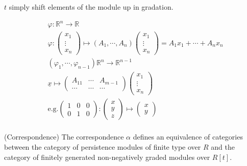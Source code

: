 \documentclass[11pt,a4paper]{report}
\begin{document}
              $t$ simply shift elements of the module up in gradation. 
              
            \begin{Ex}

              \begin{align*}
                &\varphi: \mathbb{R}^n \rightarrow \mathbb{R}\\
                &\varphi: \begin{pmatrix}x_1\\\vdots\\x_n\end{pmatrix} \mapsto (A_1, \cdots, A_n)\begin{pmatrix}x_1\\\vdots\\x_n\end{pmatrix} = A_1x_1 + \cdots + A_nx_n\\
                &(\varphi_1, \cdots, \varphi_{n-1}) \mathbb{R}^n \rightarrow \mathbb{R}^{n-1}\\
                &\underline{x} \mapsto \begin{pmatrix}A_{11} & \cdots & A_{m-1}\\ \cdots&\cdots&\cdots\end{pmatrix}\begin{pmatrix}x_1\\\vdots\\x_n\end{pmatrix}\\
                &\textrm{e.g.} \begin{pmatrix}1&0&0\\0&1&0\end{pmatrix}:\begin{pmatrix}x\\y\\z\end{pmatrix} \mapsto \begin{pmatrix}x\\y\end{pmatrix}\\
              \end{align*}

            \end{Ex}
            
            
              \begin{thm} (Correspondence) The correspondence $\alpha$ defines an equivalence of categories between the category of persistence modules of finite type over $R$ and the category of finitely generated non-negatively graded modules over $R[t]$.
              \end{thm}
\end{document}
